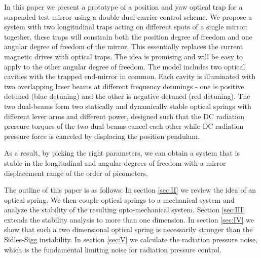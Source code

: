In this paper we present
a prototype of a position and yaw optical trap for a suspended test mirror using a double dual-carrier control 
scheme. 
We propose a system with two longitudinal traps acting on different spots of a single mirror; together, these traps will constrain both the position degree of freedom and one angular degree of freedom of the mirror.
This essentially replaces the current magnetic drives with optical traps.  The idea is promising and will be easy to apply to the other
angular degree of freedom.
The model includes two optical cavities with the trapped end-mirror in common. Each cavity is illuminated with two overlapping laser beams at different frequency detunings - one is positive detuned (blue detuning) and the other is negative detuned (red detuning).
The two dual-beams form two statically and dynamically stable optical springs with different lever arms and different power, designed such that the DC radiation pressure torques of the two dual beams cancel each other while 
DC radiation pressure force is canceled by displacing the position pendulum.

As a result, by picking the right 
parameters, we can obtain a system that is stable in the longitudinal and angular degrees of freedom with a mirror 
displacement range of the order of picometers.

The outline of this paper is as follows: In section \ref{sec:II} we review the idea of an optical spring. We then couple optical springs to a mechanical system and analyze the stability of the resulting opto-mechanical system.
Section \ref{sec:III} extends the stability analysis to more than one dimension.
In section \ref{sec:IV} we show that such a two dimensional optical spring is necessarily stronger than the Sidles-Sigg instability. In section \ref{sec:V} we calculate the radiation pressure noise, which is the fundamental limiting noise for radiation pressure control.%

